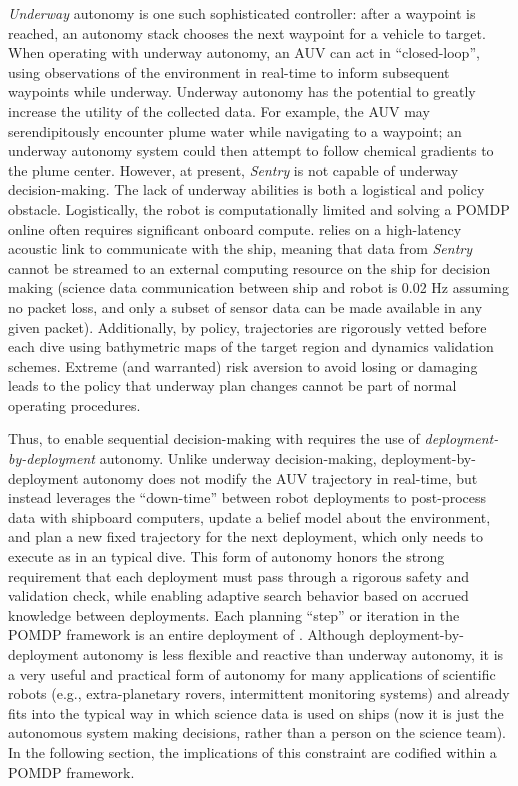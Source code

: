 \textit{Underway} autonomy is one such sophisticated controller: after a waypoint is reached, an autonomy stack chooses the next waypoint for a vehicle to target. When operating with underway autonomy, an AUV can act in ``closed-loop'', using observations of the environment in real-time to inform subsequent waypoints while underway. Underway autonomy has the potential to greatly increase the utility of the collected data. For example, the AUV may serendipitously encounter plume water while navigating to a waypoint; an underway autonomy system could then attempt to follow chemical gradients to the plume center. However, at present, \emph{Sentry} is not capable of underway decision-making. The lack of underway abilities is both a logistical and policy obstacle. Logistically, the robot is computationally limited and solving a POMDP online often requires significant onboard compute. \Sentry relies on a high-latency acoustic link to communicate with the ship, meaning that data from \emph{Sentry} cannot be streamed to an external computing resource on the ship for decision making (science data communication between ship and robot is 0.02 Hz assuming no packet loss, and only a subset of sensor data can be made available in any given packet). Additionally, by policy, \Sentry trajectories are rigorously vetted before each dive using bathymetric maps of the target region and dynamics validation schemes. Extreme (and warranted) risk aversion to avoid losing or damaging \Sentry leads to the policy that underway plan changes cannot be part of normal operating procedures.


Thus, to enable sequential decision-making with \Sentry requires the use of \emph{deployment-by-deployment} autonomy. Unlike underway decision-making, deployment-by-deployment autonomy does not modify the AUV trajectory in real-time, but instead leverages the ``down-time'' between robot deployments to post-process data with shipboard computers, update a belief model about the environment, and plan a new fixed trajectory for the next deployment, which \Sentry only needs to execute as in an typical dive. This form of autonomy honors the strong requirement that each deployment must pass through a rigorous safety and validation check, while enabling adaptive search behavior based on accrued knowledge between deployments. Each planning ``step'' or iteration in the POMDP framework is an entire deployment of \Sentry. Although deployment-by-deployment autonomy is less flexible and reactive than underway autonomy, it is a very useful and practical form of autonomy for many applications of scientific robots (e.g., extra-planetary rovers, intermittent monitoring systems) and already fits into the typical way in which science data is used on ships (now it is just the autonomous system making decisions, rather than a person on the science team). In the following section, the implications of this constraint are codified within a POMDP framework.

